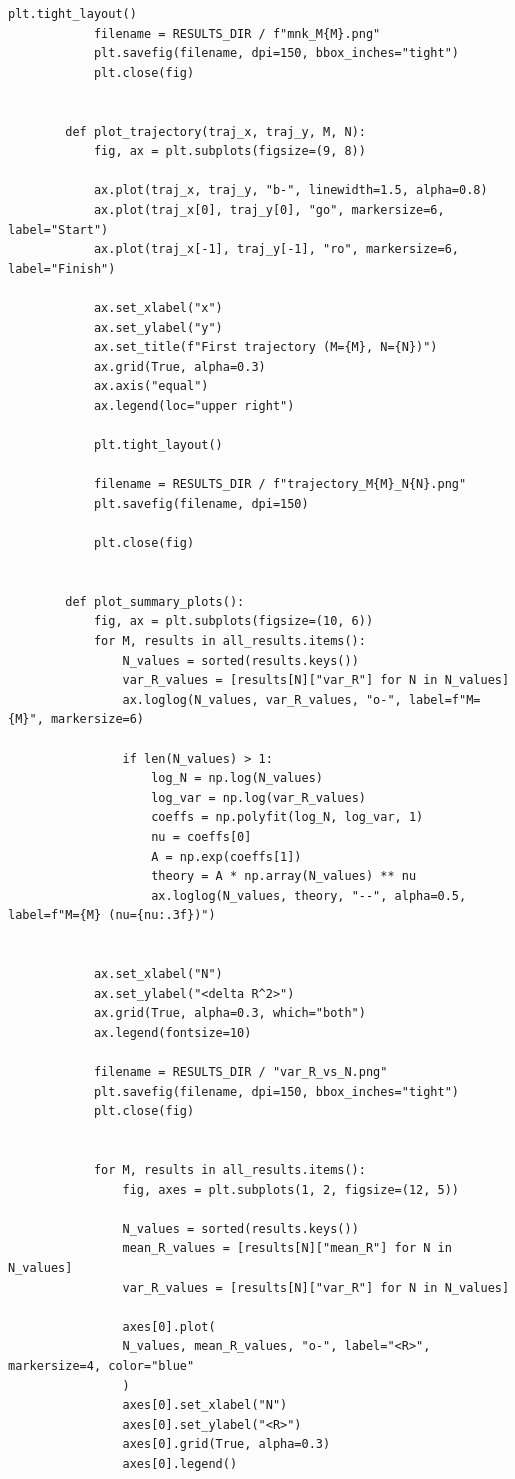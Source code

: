 \documentclass[14pt,a4paper]{extarticle}
\theoremstyle{plain}
\begin{document}
\begin{lstlisting}[title=main.py, gobble=16, breaklines=true, showspaces=false, showtabs=false, breakatwhitespace=true]
			plt.tight_layout()
			filename = RESULTS_DIR / f"mnk_M{M}.png"
			plt.savefig(filename, dpi=150, bbox_inches="tight")
			plt.close(fig)
		
		
		def plot_trajectory(traj_x, traj_y, M, N):
			fig, ax = plt.subplots(figsize=(9, 8))
			
			ax.plot(traj_x, traj_y, "b-", linewidth=1.5, alpha=0.8)
			ax.plot(traj_x[0], traj_y[0], "go", markersize=6, label="Start")
			ax.plot(traj_x[-1], traj_y[-1], "ro", markersize=6, label="Finish")
			
			ax.set_xlabel("x")
			ax.set_ylabel("y")
			ax.set_title(f"First trajectory (M={M}, N={N})")
			ax.grid(True, alpha=0.3)
			ax.axis("equal")
			ax.legend(loc="upper right")
			
			plt.tight_layout()
			
			filename = RESULTS_DIR / f"trajectory_M{M}_N{N}.png"
			plt.savefig(filename, dpi=150)

			plt.close(fig)
		
		
		def plot_summary_plots():
			fig, ax = plt.subplots(figsize=(10, 6))
			for M, results in all_results.items():
				N_values = sorted(results.keys())
				var_R_values = [results[N]["var_R"] for N in N_values]
				ax.loglog(N_values, var_R_values, "o-", label=f"M={M}", markersize=6)
				
				if len(N_values) > 1:
					log_N = np.log(N_values)
					log_var = np.log(var_R_values)
					coeffs = np.polyfit(log_N, log_var, 1)
					nu = coeffs[0]
					A = np.exp(coeffs[1])
					theory = A * np.array(N_values) ** nu
					ax.loglog(N_values, theory, "--", alpha=0.5, label=f"M={M} (nu={nu:.3f})")
			

			ax.set_xlabel("N")
			ax.set_ylabel("<delta R^2>")
			ax.grid(True, alpha=0.3, which="both")
			ax.legend(fontsize=10)
			
			filename = RESULTS_DIR / "var_R_vs_N.png"
			plt.savefig(filename, dpi=150, bbox_inches="tight")
			plt.close(fig)
			

			for M, results in all_results.items():
				fig, axes = plt.subplots(1, 2, figsize=(12, 5))
				
				N_values = sorted(results.keys())
				mean_R_values = [results[N]["mean_R"] for N in N_values]
				var_R_values = [results[N]["var_R"] for N in N_values]
				
				axes[0].plot(
				N_values, mean_R_values, "o-", label="<R>", markersize=4, color="blue"
				)
				axes[0].set_xlabel("N")
				axes[0].set_ylabel("<R>")
				axes[0].grid(True, alpha=0.3)
				axes[0].legend()
				


\end{lstlisting}
\end{document}
